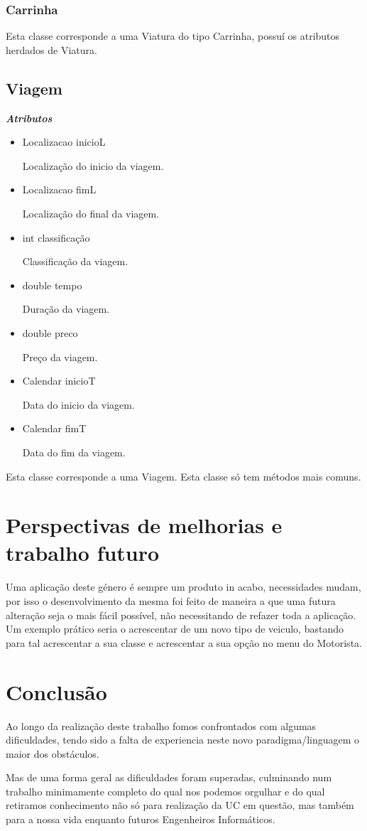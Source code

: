 \documentclass[12pt,a4paper]{report}
\begin{document}
\subsection{Carrinha}
Esta classe corresponde a uma Viatura do tipo Carrinha, possuí os atributos herdados de Viatura. 

\section{Viagem}
\emph{\bfseries Atributos}
\begin{itemize}
    \item Localizacao inicioL \par
Localização do inicio da viagem.
    \item Localizacao fimL \par
Localização do final da viagem.
    \item int classificação \par
Classificação da viagem.
    \item double tempo \par
Duração da viagem.
    \item double preco \par
Preço da viagem.
    \item Calendar inicioT \par
Data do inicio da viagem.
    \item Calendar fimT \par
Data do fim da viagem.
\end{itemize}

Esta classe corresponde a uma Viagem. Esta classe só tem métodos mais comuns. 


\chapter{Perspectivas de melhorias e trabalho futuro}

Uma aplicação deste género é sempre um produto in acabo, necessidades mudam, por isso o desenvolvimento da mesma foi feito de maneira a que uma futura alteração seja o mais fácil possível, não necessitando de refazer toda a aplicação. Um exemplo prático seria o acrescentar de um novo tipo de veiculo, bastando para tal acrescentar a sua classe e acrescentar a sua opção no menu do Motorista.  



\chapter{Conclusão}

Ao longo da realização deste trabalho fomos confrontados com algumas dificuldades, tendo sido a falta de experiencia neste novo paradigma/linguagem o maior dos obstáculos.

Mas de uma forma geral as dificuldades foram superadas, culminando num trabalho minimamente completo do qual nos podemos orgulhar e do qual retiramos conhecimento não só para realização da UC em questão, mas também para a nossa vida enquanto futuros Engenheiros Informáticos.
\end{document}
